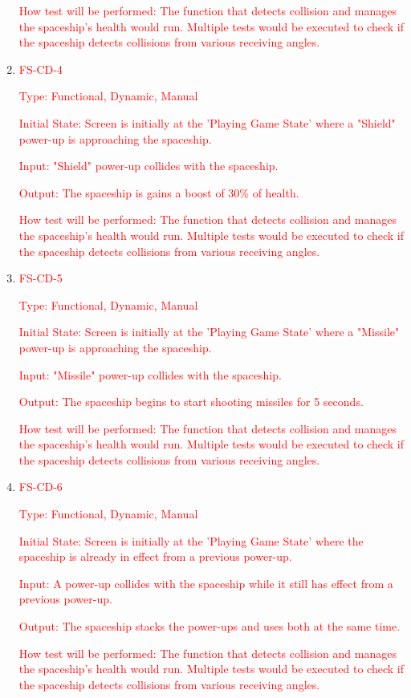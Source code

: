 \documentclass[12pt, titlepage]{article}
\begin{document}
\begin{enumerate}
\textcolor{red}{How test will be performed: The function that detects collision and manages the spaceship's health would run. Multiple tests would be executed to check if the spaceship detects collisions from various receiving angles.}

\item\textcolor{red}{FS-CD-4\\}
	
\textcolor{red}{Type: Functional, Dynamic, Manual}
				
\textcolor{red}{Initial State: Screen is initially at the 'Playing Game State' where a "Shield" power-up is approaching the spaceship.}
					
\textcolor{red}{Input: "Shield" power-up collides with the spaceship.}
					
\textcolor{red}{Output: The spaceship is gains a boost of 30\% of health.}

\textcolor{red}{How test will be performed: The function that detects collision and manages the spaceship's health would run. Multiple tests would be executed to check if the spaceship detects collisions from various receiving angles.}

\item\textcolor{red}{FS-CD-5\\}
	
\textcolor{red}{Type: Functional, Dynamic, Manual}
				
\textcolor{red}{Initial State: Screen is initially at the 'Playing Game State' where a "Missile" power-up is approaching the spaceship.}
					
\textcolor{red}{Input: "Missile" power-up collides with the spaceship.}
					
\textcolor{red}{Output: The spaceship begins to start shooting missiles for 5 seconds.}

\textcolor{red}{How test will be performed: The function that detects collision and manages the spaceship's health would run. Multiple tests would be executed to check if the spaceship detects collisions from various receiving angles.}

\item\textcolor{red}{FS-CD-6\\}
	
\textcolor{red}{Type: Functional, Dynamic, Manual}
				
\textcolor{red}{Initial State: Screen is initially at the 'Playing Game State' where the spaceship is already in effect from a previous power-up.}
					
\textcolor{red}{Input: A power-up collides with the spaceship while it still has effect from a previous power-up.}
					
\textcolor{red}{Output: The spaceship stacks the power-ups and uses both at the same time.}

\textcolor{red}{How test will be performed: The function that detects collision and manages the spaceship's health would run. Multiple tests would be executed to check if the spaceship detects collisions from various receiving angles.}
					
\end{enumerate}
\end{document}

